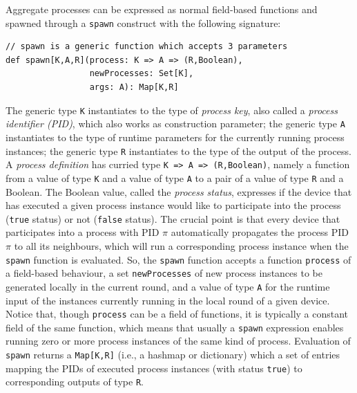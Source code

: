 Aggregate processes can be expressed as normal field-based functions and spawned through a \lstinline|spawn| construct
 with the following signature:
%
\begin{lstlisting}
// spawn is a generic function which accepts 3 parameters
def spawn[K,A,R](process: K => A => (R,Boolean),
                 newProcesses: Set[K],
                 args: A): Map[K,R]
\end{lstlisting}
%
The generic type \lstinline|K| instantiates to the type of \emph{process key}, also called a \emph{process identifier (PID)}, which also works as construction parameter;
 the generic type \lstinline|A| instantiates to the type of runtime parameters for the currently running process instances;
 the generic type \lstinline|R| instantiates to the type of the output of the process.
%
A \emph{process definition} has curried type \lstinline|K => A => (R,Boolean)|, namely a function from a value of type \lstinline|K| and a value of type \lstinline|A| to a pair of a value of type \lstinline|R| and a Boolean.
%
The Boolean value, called the \emph{process status}, expresses if the device that has executed a given process instance
 would like to participate into the process (\lstinline|true| status)
 or not (\lstinline|false| status).
%
The crucial point is that every device that participates into a process with PID $\pi$ automatically propagates the process PID $\pi$ to all its neighbours, which will run a corresponding process instance when the \lstinline|spawn| function is evaluated.
%
So, the \lstinline|spawn| function accepts a function \lstinline|process| of a field-based behaviour,
 a set \lstinline|newProcesses| of new process instances to be generated locally in the current round,
 and a value of type \lstinline|A| for the runtime input of the instances currently running in the local round of a given device.
%
Notice that, though \lstinline|process| can be a field of functions, it is typically a constant field of the same function, which means that usually a \lstinline|spawn| expression enables running zero or more process instances of the same kind of process.
%
Evaluation of \lstinline|spawn| returns a \lstinline|Map[K,R]|
 (i.e., a hashmap or dictionary) which a set of entries
 mapping the PIDs of executed process instances (with status \lstinline|true|) to corresponding outputs of type \lstinline|R|.
%

